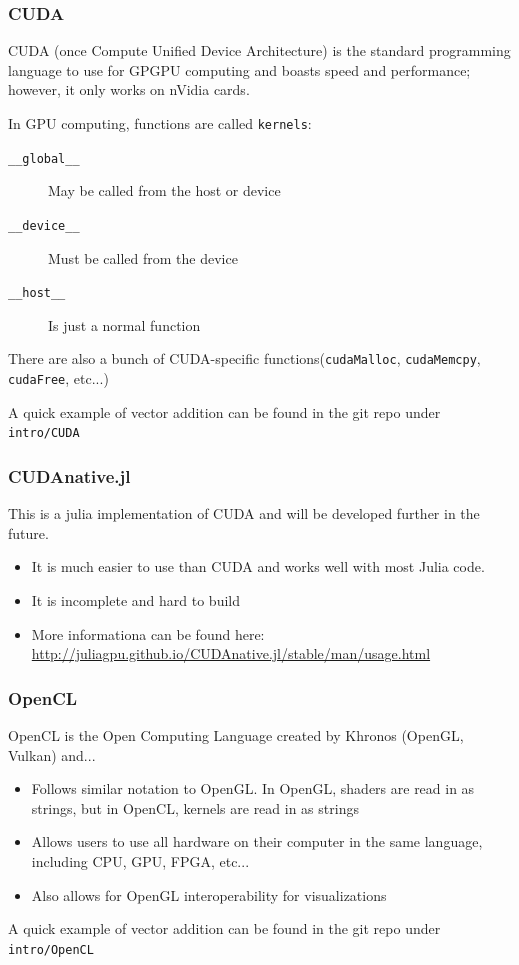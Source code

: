 \documentclass{beamer}
\begin{document}
\begin{frame}
\frametitle{CUDA}
\vspace{-0.5cm}

CUDA (once Compute Unified Device Architecture) is the standard programming language to use for GPGPU computing and boasts speed and performance; however, it only works on nVidia cards.

\vspace{0.5cm}
In GPU computing, functions are called \texttt{kernels}:
\begin{description}
\item [\texttt{\_\_global\_\_}] May be called from the host or device
\item [\texttt{\_\_device\_\_}] Must be called from the device
\item [\texttt{\_\_host\_\_}] Is just a normal function
\end{description}

There are also a bunch of CUDA-specific functions(\texttt{cudaMalloc}, \texttt{cudaMemcpy}, \texttt{cudaFree}, etc...)

\vspace{0.5cm}
A quick example of vector addition can be found in the git repo under \texttt{intro/CUDA}

\end{frame}

\begin{frame}
\frametitle{CUDAnative.jl}
This is a julia implementation of CUDA and will be developed further in the future. 

\begin{itemize}
\item It is much easier to use than CUDA and works well with most Julia code.
\item It is incomplete and hard to build
\item More informationa can be found here: \url{http://juliagpu.github.io/CUDAnative.jl/stable/man/usage.html}
\end{itemize}

\end{frame}

\begin{frame}
\frametitle{OpenCL}

OpenCL is the Open Computing Language created by Khronos (OpenGL, Vulkan) and...

\begin{itemize}
\item Follows similar notation to OpenGL. In OpenGL, shaders are read in as strings, but in OpenCL, kernels are read in as strings
\item Allows users to use all hardware on their computer in the same language, including CPU, GPU, FPGA, etc...
\item Also allows for OpenGL interoperability for visualizations
\end{itemize}

A quick example of vector addition can be found in the git repo under \texttt{intro/OpenCL}
\end{frame}
\end{document}
